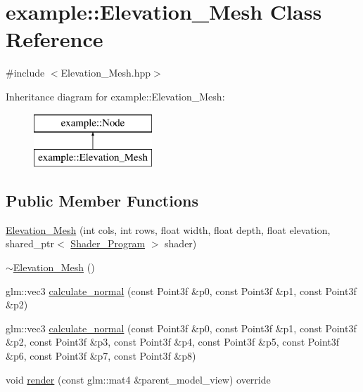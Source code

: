 \hypertarget{classexample_1_1_elevation___mesh}{}\section{example\+:\+:Elevation\+\_\+\+Mesh Class Reference}
\label{classexample_1_1_elevation___mesh}


{\ttfamily \#include $<$Elevation\+\_\+\+Mesh.\+hpp$>$}

Inheritance diagram for example\+:\+:Elevation\+\_\+\+Mesh\+:\begin{figure}[H]
\begin{center}
\leavevmode
\includegraphics[height=2.000000cm]{classexample_1_1_elevation___mesh}
\end{center}
\end{figure}
\subsection*{Public Member Functions}
\begin{DoxyCompactItemize}
\item 
\mbox{\hyperlink{classexample_1_1_elevation___mesh_a631c220a9e5c04f1c84b5301329c3791}{Elevation\+\_\+\+Mesh}} (int cols, int rows, float width, float depth, float elevation, shared\+\_\+ptr$<$ \mbox{\hyperlink{classexample_1_1_shader___program}{Shader\+\_\+\+Program}} $>$ shader)
\item 
\mbox{\hyperlink{classexample_1_1_elevation___mesh_a64aaa59bc4b872cf5180e444d3cb1073}{$\sim$\+Elevation\+\_\+\+Mesh}} ()
\item 
glm\+::vec3 \mbox{\hyperlink{classexample_1_1_elevation___mesh_a3a4637a65ae4c1a7d0f051d26b1f78d8}{calculate\+\_\+normal}} (const Point3f \&p0, const Point3f \&p1, const Point3f \&p2)
\item 
glm\+::vec3 \mbox{\hyperlink{classexample_1_1_elevation___mesh_aee6583fd55f431f0a6b8dc8e99b6db94}{calculate\+\_\+normal}} (const Point3f \&p0, const Point3f \&p1, const Point3f \&p2, const Point3f \&p3, const Point3f \&p4, const Point3f \&p5, const Point3f \&p6, const Point3f \&p7, const Point3f \&p8)
\item 
void \mbox{\hyperlink{classexample_1_1_elevation___mesh_a6af1c74193b5e68d638382caa08f1d1a}{render}} (const glm\+::mat4 \&parent\+\_\+model\+\_\+view) override
\end{DoxyCompactItemize}
